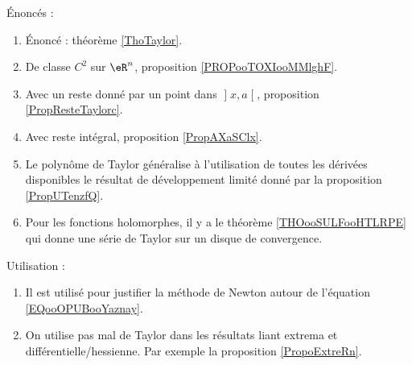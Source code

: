 

Énoncés :

    \begin{enumerate}
    \item
        Énoncé : théorème \ref{ThoTaylor}.
    \item
        De classe \( C^2\) sur \( \eR^n\), proposition \ref{PROPooTOXIooMMlghF}.
    \item
    Avec un reste donné par un point dans \( \mathopen] x , a \mathclose[\), proposition \ref{PropResteTaylorc}.
        \item
            Avec reste intégral, proposition \ref{PropAXaSClx}.
        \item
            Le polynôme de Taylor généralise à l'utilisation de toutes les dérivées disponibles le résultat de développement limité donné par la proposition \ref{PropUTenzfQ}.
        \item
            Pour les fonctions holomorphes, il y a le théorème \ref{THOooSULFooHTLRPE} qui donne une série de Taylor sur un disque de convergence.
        \end{enumerate}

Utilisation :
\begin{enumerate}
        \item
            Il est utilisé pour justifier la méthode de Newton autour de l'équation \eqref{EQooOPUBooYaznay}.
    \item
        On utilise pas mal de Taylor dans les résultats liant extrema et différentielle/hessienne. Par exemple la proposition \ref{PropoExtreRn}.
\end{enumerate}

